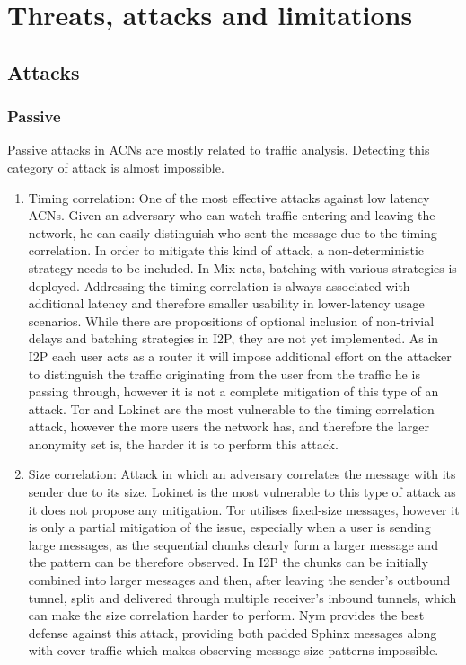 \chapter{Threats, attacks and limitations}


\section{Attacks}

\subsection{Passive}
Passive attacks in ACNs are mostly related to traffic analysis. Detecting this category of attack is almost impossible.
\begin{enumerate}
    \item Timing correlation: One of the most effective attacks against low latency ACNs. Given an adversary who can watch traffic entering and leaving the network, he can easily distinguish who sent the message due to the timing correlation. In order to mitigate this kind of attack, a non-deterministic strategy needs to be included. In Mix-nets, batching with various strategies is deployed. Addressing the timing correlation is always associated with additional latency and therefore smaller usability in lower-latency usage scenarios. While there are propositions of optional inclusion of non-trivial delays and batching strategies in I2P, they are not yet implemented. As in I2P each user acts as a router it will impose additional effort on the attacker to distinguish the traffic originating from the user from the traffic he is passing through, however it is not a complete mitigation of this type of an attack. Tor and Lokinet are the most vulnerable to the timing correlation attack, however the more users the network has, and therefore the larger anonymity set is, the harder it is to perform this attack.
    \item Size correlation: Attack in which an adversary correlates the message with its sender due to its size. Lokinet is the most vulnerable to this type of attack as it does not propose any mitigation. Tor utilises fixed-size messages, however it is only a partial mitigation of the issue, especially when a user is sending large messages, as the sequential chunks clearly form a larger message and the pattern can be therefore observed. In I2P the chunks can be initially combined into larger messages and then, after leaving the sender’s outbound tunnel, split and delivered through multiple receiver’s inbound tunnels, which can make the size correlation harder to perform. Nym provides the best defense against this attack, providing both padded Sphinx messages along with cover traffic which makes observing message size patterns impossible.

\end{enumerate}
